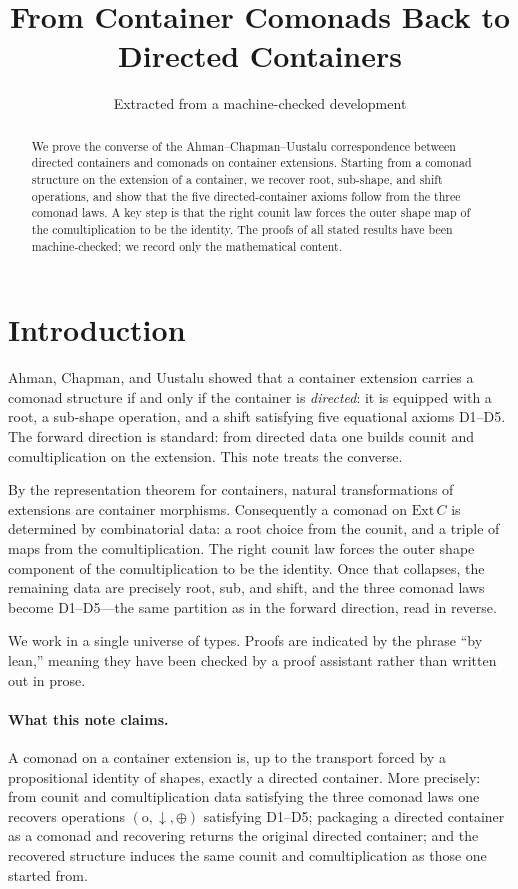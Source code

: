 \documentclass[11pt,a4paper]{article}
\title{From Container Comonads Back to Directed Containers}
\author{Extracted from a machine-checked development}
\date{}
\theoremstyle{plain}
\theoremstyle{definition}
\newcommand{\Ext}{\mathrm{Ext}}
\newcommand{\rootp}{\mathrm{o}}
\begin{document}
\maketitle

\begin{abstract}
We prove the converse of the Ahman--Chapman--Uustalu correspondence between
directed containers and comonads on container extensions. Starting from a
comonad structure on the extension of a container, we recover root, sub-shape,
and shift operations, and show that the five directed-container axioms follow
from the three comonad laws. A key step is that the right counit law forces the
outer shape map of the comultiplication to be the identity. The proofs of all
stated results have been machine-checked; we record only the mathematical
content.
\end{abstract}

\tableofcontents
\bigskip

\section{Introduction}

Ahman, Chapman, and Uustalu showed that a container extension carries a
comonad structure if and only if the container is \emph{directed}: it is
equipped with a root, a sub-shape operation, and a shift satisfying five
equational axioms D1--D5. The forward direction is standard: from directed
data one builds counit and comultiplication on the extension. This note
treats the converse.

By the representation theorem for containers, natural transformations of
extensions are container morphisms. Consequently a comonad on $\Ext\,C$ is
determined by combinatorial data: a root choice from the counit, and a triple
of maps from the comultiplication. The right counit law forces the outer shape
component of the comultiplication to be the identity. Once that collapses, the
remaining data are precisely root, sub, and shift, and the three comonad laws
become D1--D5---the same partition as in the forward direction, read in
reverse.

We work in a single universe of types. Proofs are indicated by the phrase
``by lean,'' meaning they have been checked by a proof assistant rather than
written out in prose.

\paragraph{What this note claims.}
A comonad on a container extension is, up to the transport forced by a
propositional identity of shapes, exactly a directed container. More
precisely: from counit and comultiplication data satisfying the three comonad
laws one recovers operations $(\rootp,\downarrow,\oplus)$ satisfying D1--D5;
packaging a directed container as a comonad and recovering returns the
original directed container; and the recovered structure induces the same
counit and comultiplication as those one started from.
\end{document}
